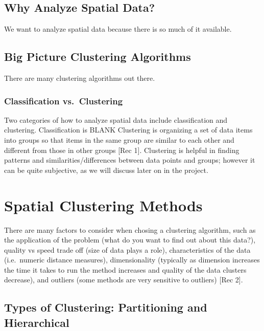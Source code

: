 \documentclass[12pt,twoside]{amherstthesis}
\begin{document}
  \section{Why Analyze Spatial Data?}\label{why-analyze-spatial-data}
  
  We want to analyze spatial data because there is so much of it
  available.
  
  \section{Big Picture Clustering
  Algorithms}\label{big-picture-clustering-algorithms}
  
  There are many clustering algorithms out there.
  
  \subsection{Classification
  vs.~Clustering}\label{classification-vs.clustering}
  
  Two categories of how to analyze spatial data include classification and
  clustering. Classification is BLANK Clustering is organizing a set of
  data items into groups so that items in the same group are similar to
  each other and different from those in other groups {[}Rec 1{]}.
  Clustering is helpful in finding patterns and similarities/differences
  between data points and groups; however it can be quite subjective, as
  we will discuss later on in the project.
  
  \hypertarget{rmd-basics}{\chapter{Spatial Clustering
  Methods}\label{rmd-basics}}
  
  There are many factors to consider when chosing a clustering algorithm,
  such as the application of the problem (what do you want to find out
  about this data?), quality vs speed trade off (size of data plays a
  role), characteristics of the data (i.e.~numeric distance measures),
  dimensionality (typically as dimension increases the time it takes to
  run the method increases and quality of the data clusters decrease), and
  outliers (some methods are very sensitive to outliers) {[}Rec 2{]}.
  
  \section{Types of Clustering: Partitioning and
  Hierarchical}\label{types-of-clustering-partitioning-and-hierarchical}
  
\end{document}
